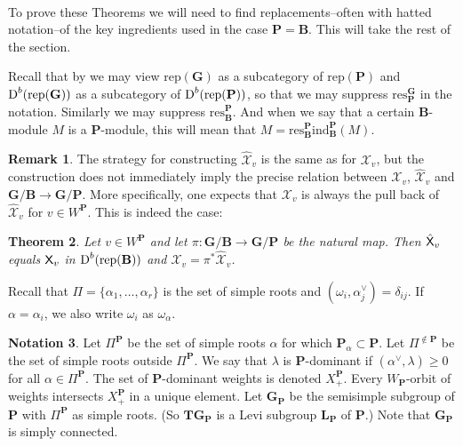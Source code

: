 \documentclass[sn-mathphys-num]{sn-jnl}%
\newcommand{\tX}{{\mathcal X}}
\newcommand{\subsetq}{\subset}
\newcommand{\rep}{{\mathrm{rep}}}
\newcommand{\ind}{{\mathrm{ind}}}
\newcommand{\res}{{\mathrm{res}}}
\newcommand*{\Dd}{\mathop{\mathrm D\kern0pt}\nolimits}
\newcommand{\bg}{\mathbf G}
\newcommand{\fb}{\mathbf B}
\newcommand{\bt}{\mathbf T}
\newcommand{\bp}{\mathbf P}
\newcommand{\bl}{\mathbf L}
\newtheorem{theorem}{Theorem}[section]
\theoremstyle{definition}
\newtheorem{remark}[theorem]{Remark}
\newtheorem{notation}[theorem]{Notation}
\begin{document}
\

To prove these Theorems we will need to find replacements--often with hatted notation--of the key ingredients used in 
the case $\bp=\fb$.
This will take the rest of the section. 



Recall that by \cite[II Corollary 4.7]{Jan} we may view $\rep(\bg)$ as a subcategory of $\rep(\bp)$
and $\Dd^b(\rep(\bg))$ as a subcategory of
$\Dd^b(\rep(\bp))$, so that we may suppress 
$\res^\bg_\bp$ in the notation. Similarly we may suppress
$\res^\bp_\fb$. And when we say that a certain $\fb$-module $M$ is a $\bp$-module, this will mean that $M=\res^\bp_\fb\ind_\fb^\bp(M)$.

\begin{remark}
The strategy for constructing $\hat\tX_v$ is the same as for $\tX_v$, but
the construction does not immediately imply the precise relation between $\tX_v$, $\hat\tX_v$ and $\bg/\fb\to \bg/\bp$.
More specifically, one expects that $\tX_v$ is always
the pull back of $\hat\tX_v$ for $v\in W^\bp$. This is indeed the case:
\end{remark}

\begin{theorem}\label{th:P and B}
Let $v\in  W^\bp$ and let $\pi:\bg/\fb\to \bg/\bp$ be the natural map.
Then ${\hat{\sf X}} _v$ equals ${{\sf X}} _v$ in $\Dd^b(\rep(\fb))$ and $\tX_v=\pi^*\hat\tX_v$.
\end{theorem}

Recall that 
$\Pi=\{\alpha _1,\dots ,\alpha _r\}$ is the set of simple roots and 
$(\omega_i,\alpha_j^\vee)=\delta_{ij}$. 
If $\alpha=\alpha_i$, we also write $\omega_i$ as $\omega_\alpha$.


\begin{notation}
Let $\Pi^\bp$ be the set of simple roots $\alpha$ for which $\bp_\alpha\subsetq \bp$.
Let $\Pi^{\notin \bp}$ be the set of simple roots outside $\Pi^\bp$.
We say that $\lambda$ is $\bp$-dominant if $(\alpha^\vee,\lambda)\geq0$ for all $\alpha\in \Pi^\bp$.
The set of $\bp$-dominant weights is denoted $X^\bp_+$.
Every $W_\bp$-orbit of weights intersects $X^\bp_+$ in a unique element.
Let $\bg_\bp$ be the semisimple subgroup of $\bp$ with $\Pi^\bp$ as simple roots. (So $\bt\bg_\bp$ is a Levi subgroup $\bl_\bp$ of $\bp$.)
Note that $\bg_\bp$ is simply connected.
\end{notation}
\end{document}
